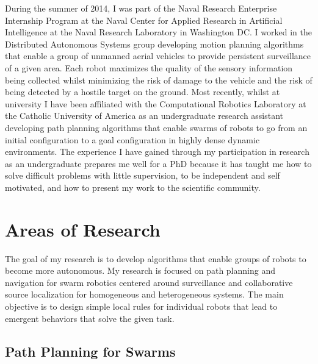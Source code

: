 \documentclass{article}
\begin{document}
During the summer of 2014, I was part of the Naval Research Enterprise
Internship Program at the Naval Center for Applied Research in Artificial
Intelligence at the Naval Research Laboratory in Washington DC. I worked in the
Distributed Autonomous Systems group developing motion planning algorithms that
enable a group of unmanned aerial vehicles to provide persistent surveillance
of a given area.  Each robot maximizes the quality of the sensory information
being collected whilst minimizing the risk of damage to the vehicle and the
risk of being detected by a hostile target on the ground.  Most recently,
whilst at university I have been affiliated with the Computational Robotics
Laboratory at the Catholic University of America as an undergraduate research
assistant developing path planning algorithms that enable swarms of robots to
go from an initial configuration to a goal configuration in highly dense
dynamic environments. The experience I have gained through my participation in
research as an undergraduate prepares me well for a PhD because it has taught
me how to solve difficult problems with little supervision, to be independent
and self motivated, and how to present my work to the scientific community.

\section{Areas of Research}

The goal of my research is to develop algorithms that enable groups of robots
to become more autonomous.  My research is focused on path planning and
navigation for swarm robotics centered around surveillance and collaborative
source localization for homogeneous and heterogeneous systems. The main
objective is to design simple local rules for individual robots that lead to
emergent behaviors that solve the given task.


\subsection{Path Planning for Swarms~\cite{crops, dcrops}}
\end{document}
